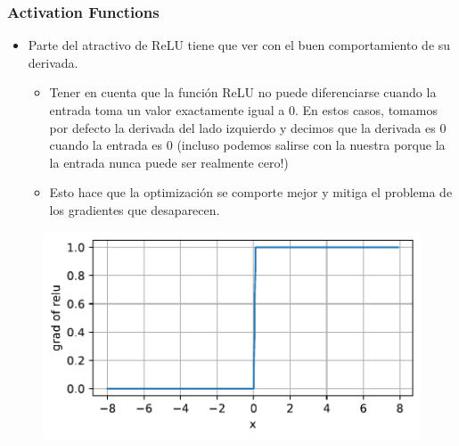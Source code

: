 \documentclass[
  shownotes,
  xcolor={svgnames},
  hyperref={colorlinks,citecolor=DarkBlue,linkcolor=DarkRed,urlcolor=DarkBlue}
  , aspectratio=169]{beamer}
\begin{document}
\begin{frame}
\frametitle{Activation Functions}
\begin{itemize}
    \item Parte del atractivo de ReLU tiene que ver con el buen comportamiento de su derivada.
    \begin{itemize}
        \item  Tener en cuenta que la función ReLU no puede diferenciarse cuando la entrada toma un valor exactamente igual a 0. En estos casos, tomamos por defecto la derivada del lado izquierdo y decimos que la derivada es 0 cuando la entrada es 0 (incluso podemos salirse con la nuestra porque la la entrada nunca puede ser realmente cero!)

        \item Esto hace que la optimización se comporte mejor y mitiga el problema de los gradientes que desaparecen.
    \end{itemize}
    
\end{itemize}



  \begin{figure}[H] \centering
            \captionsetup{justification=centering}
              \includegraphics[scale=0.45]{figures/relu_dev}
              
 \end{figure}


\end{frame}
\end{document}
